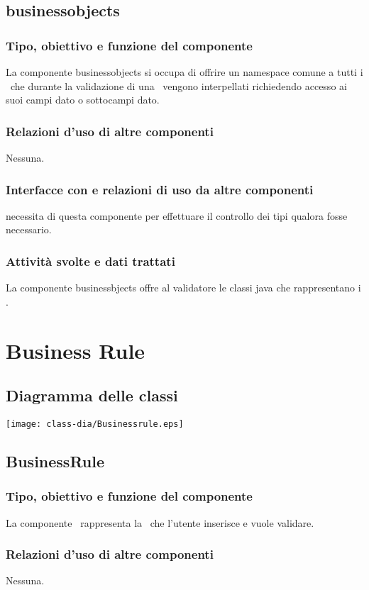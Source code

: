 \subsection{businessobjects}%
\subsubsection{Tipo, obiettivo e funzione del componente}
La componente businessobjects si occupa di offrire un namespace comune a tutti i \bos\ che durante la validazione di una \br\ vengono interpellati richiedendo accesso ai suoi campi dato o sottocampi dato.
\subsubsection{Relazioni d'uso di altre componenti}
Nessuna.
\subsubsection{Interfacce con e relazioni di uso da altre componenti}
\brp necessita di questa componente per effettuare il controllo dei tipi qualora fosse necessario.
\subsubsection{Attivit\`a svolte e dati trattati}
La componente businessbjects offre al validatore le classi java che rappresentano i \bos.

\section{Business Rule}
\subsection{Diagramma delle classi}
\begin{center}
\texttt{[image: class-dia/Businessrule.eps]}
\end{center}
\subsection{BusinessRule}
\subsubsection{Tipo, obiettivo e funzione del componente}
La componente \BR\ rappresenta la \br\ che l'utente inserisce e vuole validare.
\subsubsection{Relazioni d'uso di altre componenti}
Nessuna.
